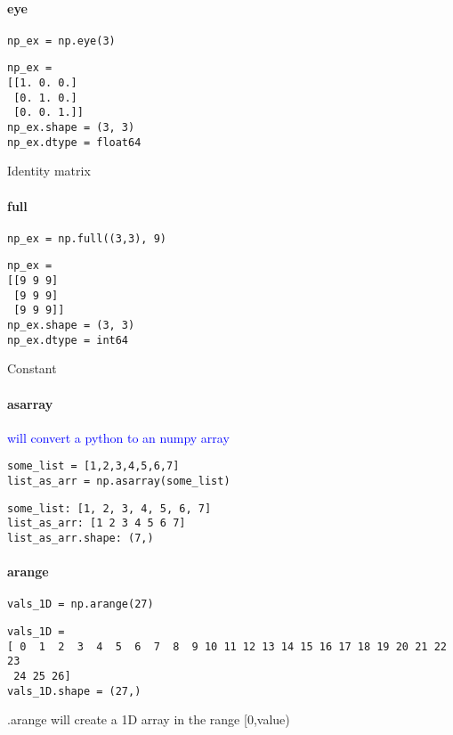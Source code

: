 \paragraph{eye}

\begin{lstlisting}[style=pyInStyle]
np_ex = np.eye(3)
\end{lstlisting}
\begin{lstlisting}[style=pyOutStyle]
np_ex = 
[[1. 0. 0.]
 [0. 1. 0.]
 [0. 0. 1.]]
np_ex.shape = (3, 3)
np_ex.dtype = float64
\end{lstlisting}
\begin{markdown}
Identity matrix
\end{markdown}


\paragraph{full}

\begin{lstlisting}[style=pyInStyle]
np_ex = np.full((3,3), 9)
\end{lstlisting}
\begin{lstlisting}[style=pyOutStyle]
np_ex = 
[[9 9 9]
 [9 9 9]
 [9 9 9]]
np_ex.shape = (3, 3)
np_ex.dtype = int64
\end{lstlisting}
\begin{markdown}
Constant
\end{markdown}

\paragraph{asarray}

\textcolor{blue}{ will convert a python  to an numpy array}

\begin{lstlisting}[style=pyInStyle]
some_list = [1,2,3,4,5,6,7]
list_as_arr = np.asarray(some_list)
\end{lstlisting}
\begin{lstlisting}[style=pyOutStyle]
some_list: [1, 2, 3, 4, 5, 6, 7]
list_as_arr: [1 2 3 4 5 6 7]
list_as_arr.shape: (7,)
\end{lstlisting}

\paragraph{arange}

\begin{lstlisting}[style=pyInStyle]
vals_1D = np.arange(27)
\end{lstlisting}
\begin{lstlisting}[style=pyOutStyle]
vals_1D = 
[ 0  1  2  3  4  5  6  7  8  9 10 11 12 13 14 15 16 17 18 19 20 21 22 23
 24 25 26]
vals_1D.shape = (27,)
\end{lstlisting}
\begin{markdown}
.arange will create a 1D array in the range [0,value)
\end{markdown}



